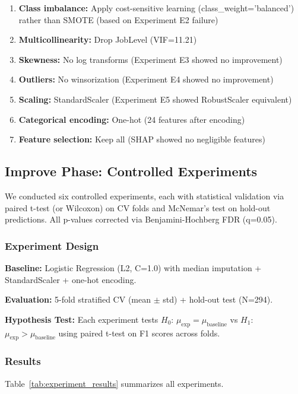 \documentclass[conference]{IEEEtran}
\begin{document}
\begin{enumerate}
    \item \textbf{Class imbalance:} Apply cost-sensitive learning (class\_weight='balanced') rather than SMOTE (based on Experiment E2 failure)
    \item \textbf{Multicollinearity:} Drop JobLevel (VIF=11.21)
    \item \textbf{Skewness:} No log transforms (Experiment E3 showed no improvement)
    \item \textbf{Outliers:} No winsorization (Experiment E4 showed no improvement)
    \item \textbf{Scaling:} StandardScaler (Experiment E5 showed RobustScaler equivalent)
    \item \textbf{Categorical encoding:} One-hot (24 features after encoding)
    \item \textbf{Feature selection:} Keep all (SHAP showed no negligible features)
\end{enumerate}

\subsection{Improve Phase: Controlled Experiments}

We conducted six controlled experiments, each with statistical validation via paired t-test (or Wilcoxon) on CV folds and McNemar's test on hold-out predictions. All p-values corrected via Benjamini-Hochberg FDR (q=0.05).

\subsubsection{Experiment Design}

\textbf{Baseline:} Logistic Regression (L2, C=1.0) with median imputation + StandardScaler + one-hot encoding.

\textbf{Evaluation:} 5-fold stratified CV (mean $\pm$ std) + hold-out test (N=294).

\textbf{Hypothesis Test:} Each experiment tests $H_0$: $\mu_{\text{exp}} = \mu_{\text{baseline}}$ vs $H_1$: $\mu_{\text{exp}} > \mu_{\text{baseline}}$ using paired t-test on F1 scores across folds.

\subsubsection{Results}

Table~\ref{tab:experiment_results} summarizes all experiments.
\end{document}
